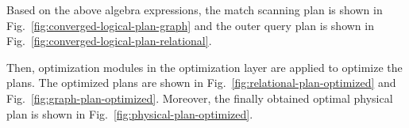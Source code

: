 \begin{example}
    Based on the above algebra expressions, the match scanning plan is shown in Fig.~\ref{fig:converged-logical-plan-graph} and the outer query plan is shown in Fig.~\ref{fig:converged-logical-plan-relational}.
    
    Then, optimization modules in the optimization layer are applied to optimize the plans.
    The optimized plans are shown in Fig.~\ref{fig:relational-plan-optimized} and Fig.~\ref{fig:graph-plan-optimized}.
    Moreover, the finally obtained optimal physical plan is shown in Fig.~\ref{fig:physical-plan-optimized}.
\end{example}

